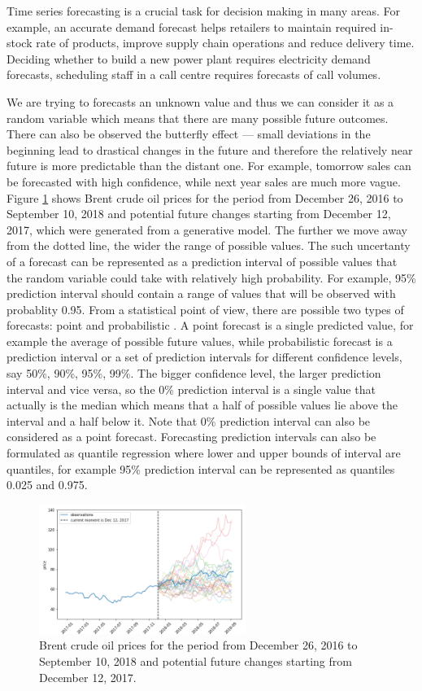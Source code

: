 \documentclass[12pt,a4paper]{article}
\begin{document}
Time series forecasting is a crucial task for decision making in many areas. For example, an accurate demand forecast helps retailers to maintain required in-stock rate of products, improve supply chain operations and reduce delivery time. Deciding whether to build a new power plant requires electricity demand forecasts, scheduling staff in a call centre requires forecasts of call volumes. 

We are trying to forecasts an unknown value and thus we can consider it as a random variable which means that there are many possible future outcomes. There can also be observed the butterfly effect — small deviations in the beginning lead to drastical changes in the future and therefore the relatively near future is more predictable than the distant one. For example, tomorrow sales can be forecasted with high confidence, while next year sales are much more vague. Figure \ref{fig:potential_future} shows Brent crude oil prices for the period from December 26, 2016 to September 10, 2018 and potential future changes starting from December 12, 2017, which were generated from a generative model. The further we move away from the dotted line, the wider the range of possible values. The such uncertanty of a forecast can be represented as a prediction interval of possible values that the random variable could take with relatively high probability. For example, 95\% prediction interval should contain a range of values that will be observed with probablity 0.95. From a statistical point of view, there are possible two types of forecasts: point and probabilistic \cite{fpp3}. A point forecast is a single predicted value, for example the average of possible future values, while probabilistic forecast is a prediction interval or a set of prediction intervals for different confidence levels, say 50\%, 90\%, 95\%, 99\%. The bigger confidence level, the larger prediction interval and vice versa, so the 0\% prediction interval is a single value that actually is the median which means that a half of possible values lie above the interval and a half below it. Note that 0\% prediction interval can also be considered as a point forecast. Forecasting prediction intervals can also be formulated as quantile regression where lower and upper bounds of interval are quantiles, for example 95\% prediction interval can be represented as quantiles 0.025 and 0.975.

\begin{figure}[!ht]
    \centering
    \includegraphics[width=0.6\textwidth]{potential_future.png}
    \caption{Brent crude oil prices for the period from December 26, 2016 to September 10, 2018 and potential future changes starting from December 12, 2017.}
    \label{fig:potential_future}
\end{figure}
\end{document}
